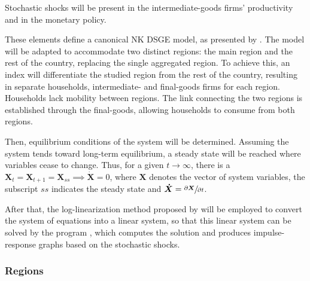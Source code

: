 \documentclass[../thesis.tex]{subfiles}
\begin{document}
	Stochastic shocks will be present in the intermediate-goods firms' productivity and in the monetary policy.
	
	
	These elements define a canonical NK DSGE model, as presented by \cite{solis-garcia_ucb_2022}. The model will be adapted to accommodate two distinct regions: the main region and the rest of the country, replacing the single aggregated region. To achieve this, an index will differentiate the studied region from the rest of the country, resulting in separate households, intermediate- and final-goods firms for each region. Households lack mobility between regions. The link connecting the two regions is established through the final-goods, allowing households to consume from both regions.

	Then, equilibrium conditions of the system will be determined. Assuming the system tends toward long-term equilibrium, a steady state will be reached where variables cease to change. Thus, for a given $t \to \infty$, there is a $\boldsymbol{X}_t = \boldsymbol{X}_{t+1} = \boldsymbol{X}_{ss} \implies \boldsymbol{\dot{X}} = 0$, where $\boldsymbol{X}$ denotes the vector of system variables, the subscript $ss$ indicates the steady state and $\boldsymbol{\dot{X}} = \sfrac{\partial \boldsymbol{X}}{\partial t}$. 
	
	After that, the log-linearization method proposed by \textcite{uhlig_toolkit_1999} will be employed to convert the system of equations into a linear system, so that this linear system can be solved by the program \dynare{}, which computes the solution and produces impulse-response graphs based on the stochastic shocks.

	
\subsubsection*{Regions}\label{sec_v6:regions}
\end{document}
